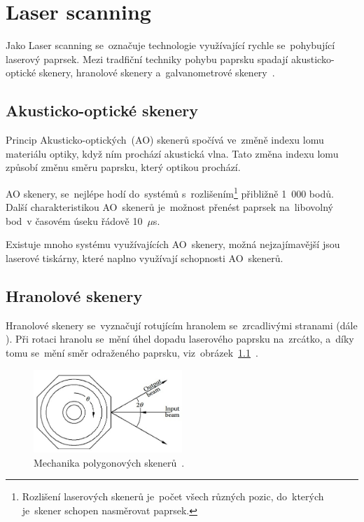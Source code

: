 \chapter{Laser scanning}

Jako Laser scanning se~označuje technologie využívající rychle se~pohybující laserový paprsek. Mezi tradfiční techniky pohybu paprsku spadají akusticko-optické skenery, hranolové skenery a~galvanometrové skenery~\cite{mems-review}.

\section{Akusticko-optické skenery}
Princip Akusticko-optických~(AO) skenerů spočívá ve~změně indexu lomu materiálu optiky, když ním prochází akustická vlna. Tato změna indexu lomu způsobí změnu směru paprsku, který optikou prochází.~\cite{scanning-handbook}

AO skenery, se~nejlépe hodí do~systémů s~rozlišením\footnote{Rozlišení laserových skenerů je~počet všech různých pozic, do~kterých je~skener schopen nasměrovat paprsek.} přibližně 1~000 bodů.
Další charakteristikou AO~skenerů je~možnost přenést paprsek na~libovolný bod~v časovém úseku řádově 10~$\mu$s.~\cite{scanning-handbook}

Existuje mnoho systému využívajících AO~skenery, možná nejzajímavější jsou laserové tiskárny, které naplno využívají schopnosti AO~skenerů.~\cite{scanning-handbook}

\section{Hranolové skenery}
Hranolové skenery se~vyznačují rotujícím hranolem se~zrcadlivými stranami (dále ).
Při rotaci hranolu se~mění úhel dopadu laserového paprsku na~zrcátko, a~díky tomu se~mění směr odraženého paprsku, viz~obrázek~\ref{fig:polygon-scanner}~\cite{scanning-handbook}.

\begin{figure}[H]
  \centering
  \includegraphics[width=0.5\textwidth]{img/polygon-scanner.jpg}
  \caption{\label{fig:polygon-scanner} Mechanika polygonových skenerů~\cite{scanning-handbook}.}
\end{figure}

